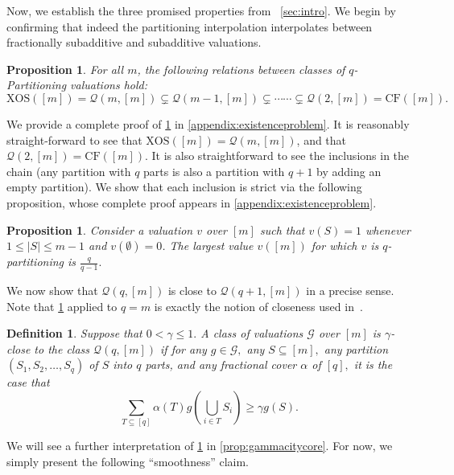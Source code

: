 \documentclass[11pt]{article}\usepackage{amsfonts}
\newtheorem{definition}[theorem]{Definition}
\newtheorem{proposition}[theorem]{Proposition}
\numberwithin{theorem}{subsection}
\newcommand{\classqm}{\mathcal{Q}(q,[m])}
\begin{document}
Now, we establish the three promised properties from ~\cref{sec:intro}. We begin by confirming that indeed the partitioning interpolation interpolates between fractionally subadditive and subadditive valuations.

\begin{proposition}
\label{prop:exisetnce}
For all $m$, the following relations between classes of $q$-Partitioning valuations hold:
$$
\text{XOS}([m]) = 
\mathcal{Q}(m, [m])\subsetneq 
\mathcal{Q}(m-1, [m])\subsetneq \cdots
\cdots \subsetneq
\mathcal{Q}(2, [m])
= \text{CF}([m]).
$$
\end{proposition}

We provide a complete proof of \cref{prop:exisetnce} in \cref{appendix:existenceproblem}. It is reasonably straight-forward to see that $\text{XOS}([m]) = 
\mathcal{Q}(m, [m])$, and that $\mathcal{Q}(2, [m])
= \text{CF}([m])$. It is also straightforward to see the inclusions in the chain (any partition with $q$ parts is also a partition with $q+1$ by adding an empty partition). We show that each inclusion is strict via the following proposition, whose complete proof appears in \cref{appendix:existenceproblem}.

\begin{proposition}
\label{prop:existenceproblem}
Consider a valuation $v$ over $[m]$ such that $v(S) = 1$ whenever $1 \le |S|\le m-1$ and $v(\emptyset) = 0$. The largest value $v([m])$ for which $v$ is $q$-partitioning is $\frac{q}{q-1}.$
\end{proposition}

We now show that $\mathcal{Q}(q,[m])$ is close to $\mathcal{Q}(q+1,[m])$ in a precise sense. Note that \cref{def:closeness} applied to $q=m$ is exactly the notion of closeness used in~\cite{BhawalkarR11}. 

\begin{definition}
\label{def:closeness}
Suppose that $0< \gamma\le 1.$
A class of valuations $\mathcal{G}$ over $[m]$ is $\gamma$-close to the class $\classqm$ if for any $g\in \mathcal{G},$ any $S\subseteq [m],$ any partition $(S_1, S_2, \ldots, S_q)$ of $S$ into $q$ parts, and any 
fractional cover $\alpha$ of $[q],$ it is the case that
$$
\sum_{{T}\subseteq [q]} \alpha({T})g(\bigcup_{i \in {T}}S_i)\ge \gamma g(S). 
$$
\end{definition}

We will see a further interpretation of \cref{def:closeness} in \cref{prop:gammacitycore}. For now, we simply present the following ``smoothness'' claim.
\end{document}
